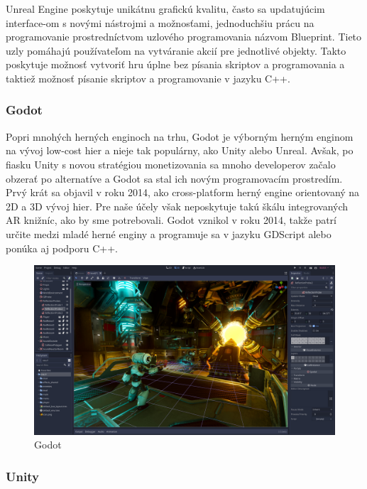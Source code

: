 Unreal Engine poskytuje unikátnu grafickú kvalitu, často sa updatujúcim interface-om s novými nástrojmi a možnosťami, jednoduchšiu prácu na programovanie prostredníctvom uzlového programovania názvom Blueprint. Tieto uzly pomáhajú používateľom na vytváranie akcií pre jednotlivé objekty. Takto poskytuje možnosť vytvoriť hru úplne bez písania skriptov a programovania a taktiež možnosť písanie skriptov a programovanie v jazyku C++. \cite{educba2023unrealengine}

\subsubsection{Godot}

Popri mnohých herných enginoch na trhu, Godot je výborným herným enginom na vývoj low-cost hier a nieje tak populárny, ako Unity alebo Unreal. Avšak, po fiasku Unity s novou stratégiou monetizovania sa mnoho developerov začalo obzerať po alternatíve a Godot sa stal ich novým programovacím prostredím. Prvý krát sa objavil v roku 2014, ako cross-platform herný engine orientovaný na 2D a 3D vývoj hier. Pre naše účely však neposkytuje takú škálu integrovaných AR knižníc, ako by sme potrebovali. Godot vznikol v roku 2014, takže patrí určite medzi mladé herné enginy a programuje sa v jazyku GDScript alebo ponúka aj podporu C++. \cite{zenva2023godot}

\begin{figure}[h]
\centering
\includegraphics[width=1\textwidth]{img/godot_editor.jpg}
\caption{Godot \cite{godottps}}
\label{fig:godotEditor}
\end{figure}

\subsubsection{Unity}

